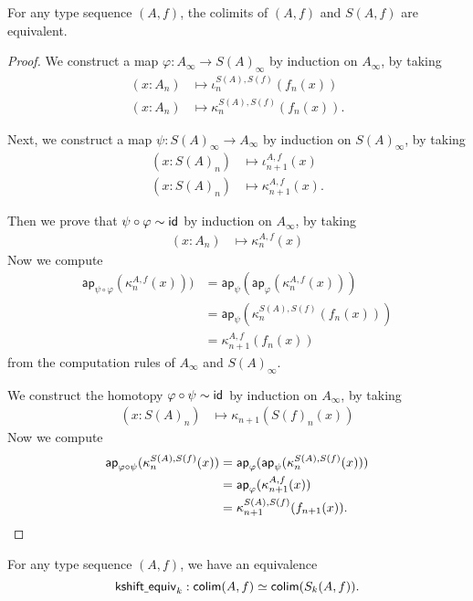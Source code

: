 \begin{lem}\label{lem:colim_shift}
For any type sequence $(A,f)$, the colimits of $(A,f)$ and $S(A,f)$ are equivalent.
\end{lem}

\begin{proof}
We construct a map $\varphi:A_\infty \to S(A)_\infty$ by induction on $A_\infty$, by taking
\begin{align*}
(x:A_n) & \mapsto \iota^{S(A),S(f)}_n(f_n(x)) \\
(x:A_n) & \mapsto \kappa^{S(A),S(f)}_n(f_n(x)).
\end{align*}

Next, we construct a map $\psi:S(A)_\infty\to A_\infty$ by induction on $S(A)_\infty$, by taking
\begin{align*}
(x:S(A)_n) & \mapsto \iota^{A,f}_{n+1}(x) \\
(x:S(A)_n) & \mapsto \kappa^{A,f}_{n+1}(x).
\end{align*}

Then we prove that $\psi\circ \varphi\sim \mathsf{id}_{}$ by induction on $A_\infty$, by taking
\begin{align*}
(x:A_n) & \mapsto \kappa^{A,f}_n(x)
\end{align*}
Now we compute
\begin{align*}
\mathsf{ap}_{\psi\circ\varphi}(\kappa^{A,f}_n(x))) & = \mathsf{ap}_\psi(\mathsf{ap}_\varphi(\kappa^{A,f}_n(x))) \\
& = \mathsf{ap}_\psi(\kappa^{S(A),S(f)}_n(f_n(x))) \\
& = \kappa^{A,f}_{n+1}(f_n(x))
\end{align*}
from the computation rules of $A_\infty$ and $S(A)_\infty$.

We construct the homotopy $\varphi\circ\psi\sim\mathsf{id}_{}$ by induction on $A_\infty$, by taking
\begin{align*}
(x:S(A)_n) & \mapsto \kappa_{n+1}(S(f)_n(x))
\end{align*}
Now we compute
\begin{align*}
\mathsf{ap}_{\varphi\circ\psi}(\kappa^{S(A),S(f)}_n(x)) & = \mathsf{ap}_\varphi(\mathsf{ap}_\psi(\kappa^{S(A),S(f)}_n(x))) \\
& = \mathsf{ap}_\varphi(\kappa^{A,f}_{n+1}(x)) \\
& = \kappa^{S(A),S(f)}_{n+1}(f_{n+1}(x)).\qedhere
\end{align*}
\end{proof}

\begin{lem}\label{lem:colim_shift_k}
For any type sequence $(A,f)$, we have an equivalence
\begin{equation*}
\mathsf{kshift\underline{~}equiv}_{k} : \mathsf{colim}(A,f)\simeq\mathsf{colim} (S_k(A,f)).
\end{equation*}
\end{lem}

